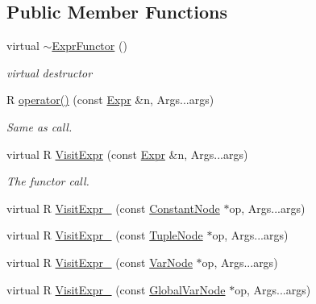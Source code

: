 \subsection*{Public Member Functions}
\begin{DoxyCompactItemize}
\item 
virtual \hyperlink{classtvm_1_1relay_1_1ExprFunctor_3_01R_07const_01Expr_01_6n_00_01Args_8_8_8_08_4_ae79b1dffcf943b65cc439b8a9f4697a2}{$\sim$\+Expr\+Functor} ()
\begin{DoxyCompactList}\small\item\em virtual destructor \end{DoxyCompactList}\item 
R \hyperlink{classtvm_1_1relay_1_1ExprFunctor_3_01R_07const_01Expr_01_6n_00_01Args_8_8_8_08_4_a1d1f97a992335d11f080a7c095d60011}{operator()} (const \hyperlink{namespacetvm_1_1relay_a5b84e3790f89bb3fad5c7911eeb99531}{Expr} \&n, Args...\+args)
\begin{DoxyCompactList}\small\item\em Same as call. \end{DoxyCompactList}\item 
virtual R \hyperlink{classtvm_1_1relay_1_1ExprFunctor_3_01R_07const_01Expr_01_6n_00_01Args_8_8_8_08_4_aa256ca2ead1de49b1b4b867dde835514}{Visit\+Expr} (const \hyperlink{namespacetvm_1_1relay_a5b84e3790f89bb3fad5c7911eeb99531}{Expr} \&n, Args...\+args)
\begin{DoxyCompactList}\small\item\em The functor call. \end{DoxyCompactList}\item 
virtual R \hyperlink{classtvm_1_1relay_1_1ExprFunctor_3_01R_07const_01Expr_01_6n_00_01Args_8_8_8_08_4_a045072329e79fa39647597bf45e064e9}{Visit\+Expr\+\_\+} (const \hyperlink{classtvm_1_1relay_1_1ConstantNode}{Constant\+Node} $\ast$op, Args...\+args)
\item 
virtual R \hyperlink{classtvm_1_1relay_1_1ExprFunctor_3_01R_07const_01Expr_01_6n_00_01Args_8_8_8_08_4_a2a377d6f9a5721920cf704b60553e7ea}{Visit\+Expr\+\_\+} (const \hyperlink{classtvm_1_1relay_1_1TupleNode}{Tuple\+Node} $\ast$op, Args...\+args)
\item 
virtual R \hyperlink{classtvm_1_1relay_1_1ExprFunctor_3_01R_07const_01Expr_01_6n_00_01Args_8_8_8_08_4_abbc94edb62804de97890effaf22b183a}{Visit\+Expr\+\_\+} (const \hyperlink{classtvm_1_1relay_1_1VarNode}{Var\+Node} $\ast$op, Args...\+args)
\item 
virtual R \hyperlink{classtvm_1_1relay_1_1ExprFunctor_3_01R_07const_01Expr_01_6n_00_01Args_8_8_8_08_4_abdf289c25698ddb88156932d6bed6a74}{Visit\+Expr\+\_\+} (const \hyperlink{namespacetvm_1_1relay_afe7144195dbbc914183189444ef6a347}{Global\+Var\+Node} $\ast$op, Args...\+args)

\end{DoxyCompactItemize}
